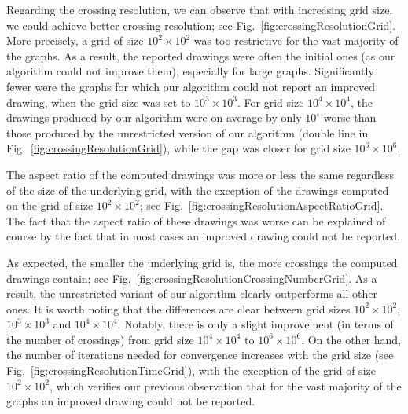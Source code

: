\documentclass[runningheads]{llncs}
\begin{document}
Regarding the crossing resolution, we can observe that with increasing grid size, we could achieve better crossing resolution; see Fig.~\ref{fig:crossingResolutionGrid}. More precisely, a grid of size $10^2 \times 10^2$ was too restrictive for the vast majority of the graphs. As a result, the reported drawings were often the initial ones (as our algorithm could not improve them), especially for large graphs. Significantly fewer were the graphs for which our algorithm could not report an improved drawing, when the grid size was set to $10^3 \times 10^3$.
For grid size $10^4 \times 10^4$, the drawings produced by our algorithm were on average by only $10^\circ$ worse than those produced by the unrestricted version of our algorithm (double line in Fig.~\ref{fig:crossingResolutionGrid}), while the gap was closer for grid size $10^6 \times 10^6$.

The aspect ratio of the computed drawings was more or less the same regardless of the size of the underlying grid, with the exception of the drawings computed on the grid of size $10^2 \times 10^2$; see Fig.~\ref{fig:crossingResolutionAspectRatioGrid}. The fact that the aspect ratio of these drawings was worse can be explained of course by the fact that in most cases an improved drawing could not be reported.

As expected, the smaller the underlying grid is, the more crossings the computed drawings contain; see Fig.~\ref{fig:crossingResolutionCrossingNumberGrid}. As a result, the unrestricted variant of our algorithm clearly outperforms all other ones. It is worth noting that the differences are clear between grid sizes $10^2 \times 10^2$, $10^3 \times 10^3$ and $10^4 \times 10^4$. Notably, there is only a slight improvement (in terms of the number of crossings) from grid size $10^4 \times 10^4$ to $10^6 \times 10^6$. %
%
On the other hand, the number of iterations needed for convergence increases with the grid size (see Fig.~\ref{fig:crossingResolutionTimeGrid}), with the exception of the grid of size $10^2 \times 10^2$, which verifies our previous observation that for the vast majority of the graphs an improved drawing could not be reported.
\end{document}
